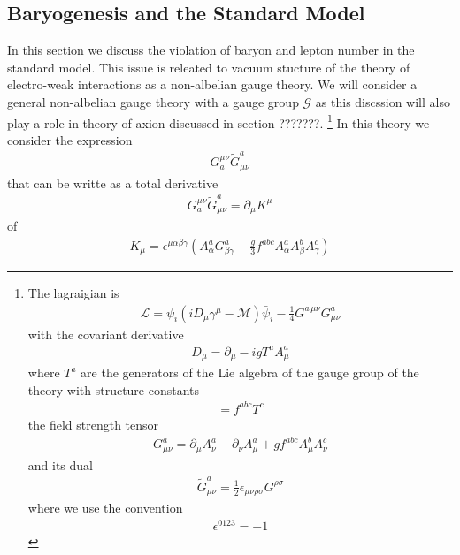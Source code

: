 \documentclass[13pt,a4paper,twoside,titlepage]{article}
\begin{document}
\subsection{Baryogenesis and the Standard Model}
In this section we discuss the violation of baryon and lepton number in the standard model. This issue is releated to vacuum stucture of the theory of electro-weak interactions as a
non-albelian gauge theory.
We will consider a general non-albelian gauge theory with a gauge group $\mathcal{G}$ as this discssion will also play a role in theory of axion discussed in section ???????.  \footnote{
The lagraigian is
\begin{align}
    \mathcal{L} = \psi_i \left( i D_\mu \gamma^\mu - \mathcal{M} \right) \bar{\psi}_i - \frac{1}{4} G^{a \, \mu \nu} G^a_{\mu \nu}
\end{align}
with the covariant derivative
\begin{align}
    D_\mu = \partial_\mu - i g T^a A^a_\mu
\end{align}
where $T^a$ are the generators of the Lie algebra of the gauge group of the theory with structure constants
\begin{align}
    [T^a, T^b] = f^{abc} T^c
\end{align}
the field strength tensor
\begin{align}
    G^a_{\mu \nu} = \partial_\mu A^a_\nu - \partial_\nu A^a_\mu + g f^{abc} A^b_\mu A^c_\nu
\end{align}
and its dual
\begin{align}
    \tilde{G}_{\mu \nu}^a = \frac{1}{2} \epsilon_{\mu \nu \rho \sigma} G^{\rho \sigma}
\end{align}
where we use the convention
\begin{align}
    \epsilon^{0123} = -1
\end{align}
}
In this theory we consider the expression
\begin{align}
    G^{\mu \nu}_a \tilde{G}^a_{\mu \nu}
\end{align}
that can be writte as a total derivative
\begin{align}
    G^{\mu \nu}_a \tilde{G}^a_{\mu \nu} = \partial_\mu K^\mu
\end{align}
of 
\begin{align}
    K_\mu = \epsilon^{\mu \alpha \beta \gamma} \left( A^a_\alpha G^a_{\beta \gamma} - \frac{g}{3} f^{abc} A^a_\alpha A^b_\beta A^c_\gamma \right)
\end{align}
\end{document}
